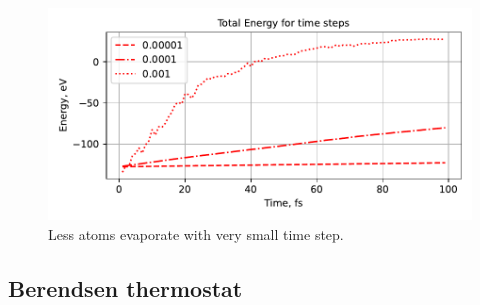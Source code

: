 \documentclass[12pt,a4paper]{article}
\begin{document}
\begin{figure}[htb]
	\centering
	\includegraphics[width=.7\linewidth]{img/fig_total_energy.pdf}
	\caption{Less atoms evaporate with very small time step.}
	\label{fig:first_simulation}
\end{figure}


\subsection*{Berendsen thermostat}
\end{document}

